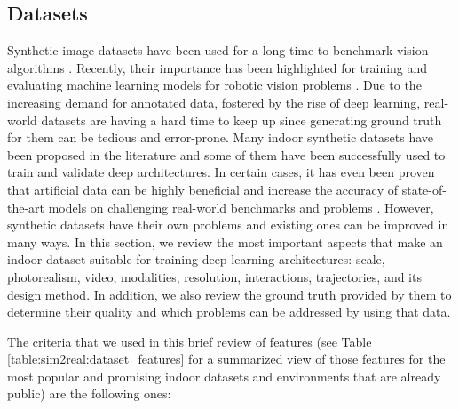 
\subsection{Datasets}

Synthetic image datasets have been used for a long time to benchmark vision algorithms \cite{Butler2012}. Recently, their importance has been highlighted for training and evaluating machine learning models for robotic vision problems \cite{Brodeur2017, Ros2016, Mahler2017dex}. Due to the increasing demand for annotated data, fostered by the rise of deep learning, real-world datasets are having a hard time to keep up since generating ground truth for them can be tedious and error-prone. Many indoor synthetic datasets have been proposed in the literature and some of them have been successfully used to train and validate deep architectures. In certain cases, it has even been proven that artificial data can be highly beneficial and increase the accuracy of state-of-the-art models on challenging real-world benchmarks and problems \cite{Shrivastava2017,Barbosa2018, Ros2016}. However, synthetic datasets have their own problems and existing ones can be improved in many ways. In this section, we review the most important aspects that make an indoor dataset suitable for training deep learning architectures: scale, photorealism, video, modalities, resolution, interactions, trajectories, and its design method. In addition, we also review the ground truth provided by them to determine their quality and which problems can be addressed by using that data.

The criteria that we used in this brief review of features (see Table \ref{table:sim2real:dataset_features} for a summarized view of those features for the most popular and promising indoor datasets and environments that are already public) are the following ones:

\clearpage

